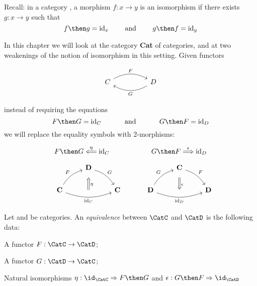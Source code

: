 
Recall: in a category \CatC, a morphism $f: x \rightarrow y$ is an isomorphism if there exists $g : x \rightarrow y$ such that 
$$
f \then g = \text{id}_x \quad \quad \text{ and } \quad \quad g \then f = \text{id}_y
$$


In this chapter we will look at the category \textbf{Cat} of categories, and at two weakenings of the notion of isomorphism in this setting. 
Given functors

\[\begin{tikzcd}
	C && D
	\arrow["F", bend left=30, from=1-1, to=1-3]
	\arrow["G", bend left=30, from=1-3, to=1-1]
\end{tikzcd}\]

instead of requiring the equations
$$
F \then G = \text{id}_C  \quad \quad \quad  \text{ and } \quad \quad \quad G \then F = \text{id}_D
$$
we will replace the equality symbols with 2-morphisms:
\

$$
F \then G \overset{\eta}{\Longleftarrow} \text{id}_C  \quad \quad \quad \quad \quad \quad G \then F \overset{\epsilon}{\Longrightarrow} \text{id}_D
$$


\[
\quad
\begin{tikzcd}
	& {\mathbf{D}} \\
	{\mathbf{C}} && {\mathbf{C}}
	\arrow["F", bend left=20, from=2-1, to=1-2]
	\arrow["G", bend left=20, from=1-2, to=2-3]
	\arrow[""{name=0, anchor=center, inner sep=0}, "{\text{id}_C}"', bend right=20, from=2-1, to=2-3]
	\arrow["\eta", shorten <=7pt, shorten >=10pt, Leftarrow, from=1-2, to=0]
\end{tikzcd}
\quad \quad \quad 
\begin{tikzcd}
	& {\mathbf{C}} \\
	{\mathbf{D}} && {\mathbf{D}}
	\arrow["G", bend left=20, from=2-1, to=1-2]
	\arrow["F", bend left=20, from=1-2, to=2-3]
	\arrow[""{name=0, anchor=center, inner sep=0}, "{\text{id}_D}"', bend right=20, from=2-1, to=2-3]
	\arrow["\epsilon", shorten <=7pt, shorten >=10pt, Rightarrow, from=1-2, to=0]
\end{tikzcd}
\]

\begin{ctdefinition}[]
\label{def:cat-equivalence}
Let \CatC and \CatD be categories. An \emph{equivalence} between $\CatC$ and $\CatD$ is the following data:
\begin{compactenum}
\item A functor $F:  \CatC \rightarrow \CatD$;
\item A functor $G: \CatD \rightarrow \CatC $; 
\item Natural isomorphisms $\eta : \id_\CatC \Rightarrow F \then G$ and $\epsilon : G \then F \Rightarrow \id_\CatD$
\end{compactenum}
\end{ctdefinition}


